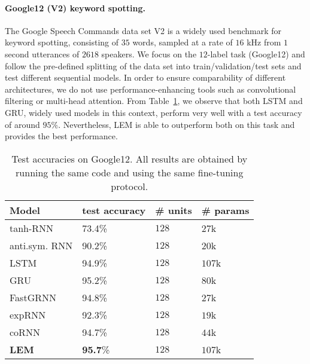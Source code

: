 \documentclass{article} \usepackage{iclr2022_conference,times}
\newcommand{\Tref}[1]{Table~\ref{#1}}
\begin{document}
\paragraph{Google12 (V2) keyword spotting.}
The Google Speech Commands data set V2 \citep{google12} is a widely used benchmark for keyword spotting, consisting of $35$ words, sampled at a rate of $16$ kHz from $1$ second utterances of $2618$ speakers. We focus on the $12$-label task (Google12) and follow the pre-defined splitting of the data set into train/validation/test sets and test different sequential models. In order to ensure comparability of different architectures, we do not use performance-enhancing tools such as convolutional filtering or multi-head attention. From \Tref{tab:google12}, we observe that both LSTM and GRU, widely used models in this context, perform very well with a test accuracy of around $95\%$. Nevertheless, LEM is able to outperform both on this task and provides the best performance. 
\begin{table}[ht!]
  \caption{Test accuracies on Google12. All results are obtained by running the same code and using the same fine-tuning protocol.}
  \label{tab:google12}
  \centering
  \begin{tabular}{llll}
    \toprule
    \cmidrule(r){1-4}
    { Model} &  test accuracy & \# units & \# params \\
    \midrule
tanh-RNN & 73.4\% & $128$ & $27$k\\
anti.sym. RNN & 90.2\% & $128$ & $20$k\\
LSTM  & 94.9\% & $128$ & $107$k\\
GRU  & 95.2\% & $128$ & $80$k  \\
FastGRNN  & 94.8\%& $128$ & $27$k \\
expRNN & 92.3\% & $128$ & $19$k \\
coRNN  &94.7\% & $128$ & $44$k \\
\textbf{LEM}  & \textbf{95.7}\% & $128$ & $107$k \\
\bottomrule
\end{tabular}
\end{table}
\end{document}
